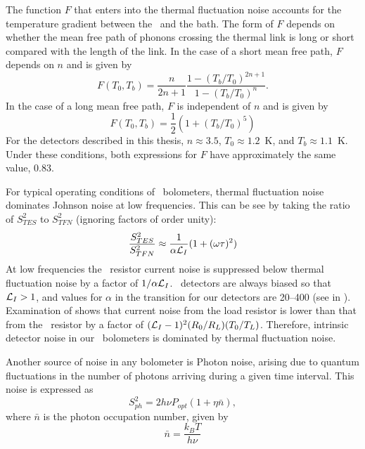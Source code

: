 The function $F$ that enters into the thermal fluctuation noise accounts for the temperature gradient between the \TES\ and the bath.
The form of $F$ depends on whether the mean free path of phonons crossing the thermal link is long or short compared with the length of the link.
In the case of a short mean free path, $F$ depends on $n$ and is given by \cite{mather_bolometer_1982}
\begin{equation}
  F(T_0,T_b) = \frac{n}{2n+1} \frac{1 - (T_b/T_0)^{2n+1}}{1 - (T_b/T_0)^{n}}.
\end{equation}
In the case of a long mean free path, $F$ is independent of $n$ and is given by \cite{boyle_performance_1959}
\begin{equation}
  F(T_0, T_b) = \frac{1}{2} (1 + (T_b/T_0)^5)
\end{equation}
For the detectors described in this thesis, $n \approx 3.5$, $T_0 \approx 1.2$~K, and $T_b \approx 1.1$~K.
Under these conditions, both expressions for $F$ have approximately the same value, 0.83.

For typical operating conditions of \TES\ bolometers, thermal fluctuation noise dominates Johnson noise at low frequencies.
This can be see by taking the ratio of $S^2_{TES}$ to $S^2_{TFN}$ (ignoring factors of order unity):
\begin{equation}
\frac{S^2_{TES}}{S^2_{TFN}} \approx \frac{1}{\alpha \mathcal{L}_I} (1 + (\omega \tau)^2)
\end{equation}
At low frequencies the \TES\ resistor current noise is suppressed below thermal fluctuation noise by a factor of $1/\alpha \mathcal{L}_I$.
\TES\ detectors are always biased so that $\mathcal{L}_I > 1$, and values for $\alpha$ in the transition for our detectors are 20--400 (see  in ).
Examination of  shows that current noise from the load resistor is lower than that from the \TES\ resistor by a factor of $(\mathcal{L}_I-1)^2 (R_0 / R_L) (T_0/T_L)$.
Therefore, intrinsic detector noise in our \TES\ bolometers is dominated by thermal fluctuation noise.

Another source of noise in any bolometer is Photon noise, arising due to quantum fluctuations in the number of photons arriving during a given time interval.
This noise is expressed as \cite{zmuidzinas_thermal_2003}
\begin{equation}\label{eqn:photon-noise}
  S^2_{ph} = 2 h \nu P_{opt} (1 + \eta \bar{n}),
\end{equation}
where $\bar{n}$ is the photon occupation number, given by
\begin{equation}
  \bar{n} = \frac{k_B T}{h \nu}
\end{equation}

